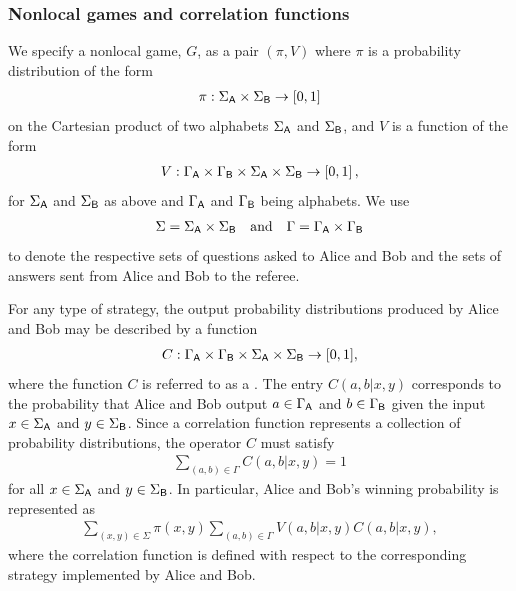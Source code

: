 \subsubsection*{Nonlocal games and correlation functions}
\label{sec:correlation-operators-for-nonlocal-games}

We specify a nonlocal game, $G$, as a pair $(\pi,V)$ where $\pi$ is a probability distribution of the form 
\begin{align}
	\pi : \Sigma_{\mathsf{A}} \times \Sigma_{\mathsf{B}} \rightarrow \left[0,1\right]
\end{align}
on the Cartesian product of two alphabets $\Sigma_{\mathsf{A}}$ and $\Sigma_{\mathsf{B}}$, and $V$ is a function of the form 
\begin{align}
	V : \Gamma_{\mathsf{A}} \times \Gamma_{\mathsf{B}} \times \Sigma_{\mathsf{A}} \times \Sigma_{\mathsf{B}} \rightarrow \left[0,1\right],
\end{align}
for $\Sigma_{\mathsf{A}}$ and $\Sigma_{\mathsf{B}}$ as above and $\Gamma_{\mathsf{A}}$ and $\Gamma_{\mathsf{B}}$ being alphabets. We use
\begin{align}
	\Sigma = \Sigma_{\mathsf{A}} \times \Sigma_{\mathsf{B}} \quad \textnormal{and} \quad \Gamma = \Gamma_{\mathsf{A}} \times \Gamma_{\mathsf{B}}
\end{align}
to denote the respective sets of questions asked to Alice and Bob and the sets of answers sent from Alice and Bob to the referee. 

For any type of strategy, the output probability distributions produced by Alice and Bob may be described by a function
\begin{align}
	C : \Gamma_{\mathsf{A}} \times \Gamma_{\mathsf{B}} \times \Sigma_{\mathsf{A}} \times \Sigma_{\mathsf{B}} \rightarrow [0,1],
\end{align}
where the function $C$ is referred to as a . The entry $C(a,b|x,y)$ corresponds to the probability that Alice and Bob output $a \in \Gamma_{\mathsf{A}}$ and $b \in \Gamma_{\mathsf{B}}$ given the input $x \in \Sigma_{\mathsf{A}}$ and $y \in \Sigma_{\mathsf{B}}$. Since a correlation function represents a collection of probability distributions, the operator $C$ must satisfy 
\begin{align}
	\sum_{(a,b) \in \Gamma} C(a,b|x,y) = 1
\end{align}
for all $x \in \Sigma_{\mathsf{A}}$ and $y \in \Sigma_{\mathsf{B}}$. In particular, Alice and Bob's winning probability is represented as 
\begin{align} \label{eq:correlation-function}
	\sum_{(x,y) \in \Sigma} \pi(x,y) \sum_{(a,b) \in \Gamma} V(a,b|x,y) C(a,b|x,y),
\end{align}
where the correlation function is defined with respect to the corresponding strategy implemented by Alice and Bob. 


